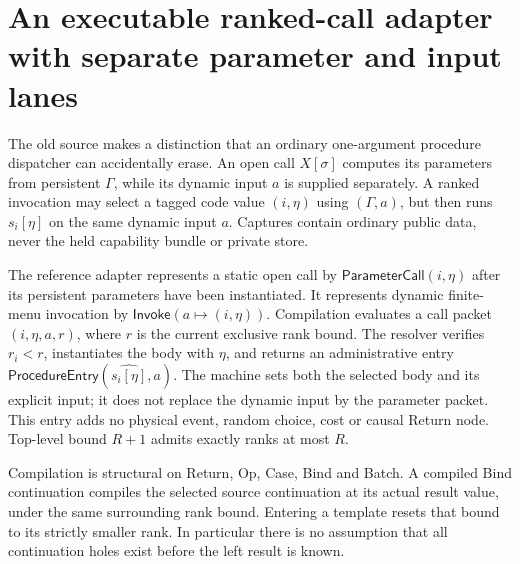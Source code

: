 \documentclass[11pt]{article}
\begin{document}
\section{An executable ranked-call adapter with separate parameter and input lanes}
The old source makes a distinction that an ordinary one-argument procedure dispatcher can accidentally erase. An open call $X[\sigma]$ computes its parameters from persistent $\Gamma$, while its dynamic input $a$ is supplied separately. A ranked invocation may select a tagged code value $(i,\eta)$ using $(\Gamma,a)$, but then runs $s_i[\eta]$ on the same dynamic input $a$. Captures contain ordinary public data, never the held capability bundle or private store.

The reference adapter represents a static open call by $\mathsf{ParameterCall}(i,\eta)$ after its persistent parameters have been instantiated. It represents dynamic finite-menu invocation by $\mathsf{Invoke}(a\mapsto(i,\eta))$. Compilation evaluates a call packet $(i,\eta,a,r)$, where $r$ is the current exclusive rank bound. The resolver verifies $r_i<r$, instantiates the body with $\eta$, and returns an administrative entry $\mathsf{ProcedureEntry}(\widehat{s_i[\eta]},a)$. The machine sets both the selected body and its explicit input; it does not replace the dynamic input by the parameter packet. This entry adds no physical event, random choice, cost or causal Return node. Top-level bound $R+1$ admits exactly ranks at most $R$.

Compilation is structural on Return, Op, Case, Bind and Batch. A compiled Bind continuation compiles the selected source continuation at its actual result value, under the same surrounding rank bound. Entering a template resets that bound to its strictly smaller rank. In particular there is no assumption that all continuation holes exist before the left result is known.
\end{document}

